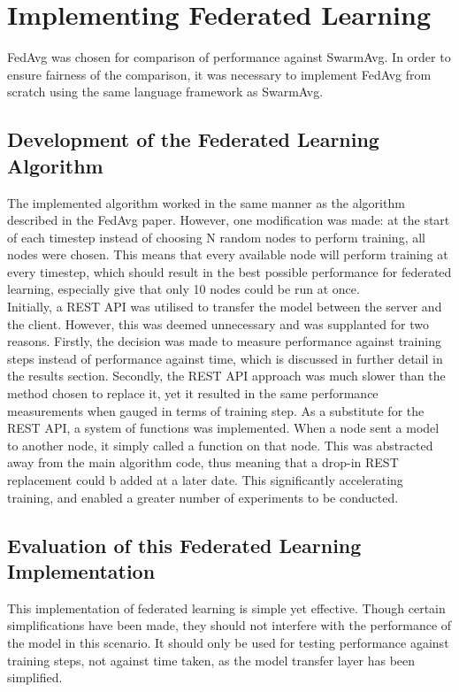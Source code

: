 \section{Implementing Federated Learning}
FedAvg was chosen for comparison of performance against SwarmAvg. In order to ensure fairness of the comparison, it was necessary to implement FedAvg from scratch using the same language framework as SwarmAvg.
\subsection{Development of the Federated Learning Algorithm}
The implemented algorithm worked in the same manner as the algorithm described in the FedAvg paper. However, one modification was made: at the start of each timestep instead of choosing N random nodes to perform training, all nodes were chosen. This means that every available node will perform training at every timestep, which should result in the best possible performance for federated learning, especially give that only 10 nodes could be run at once. \\

Initially, a REST API was utilised to transfer the model between the server and the client. However, this was deemed unnecessary and was supplanted for two reasons. Firstly, the decision was made to measure performance against training steps instead of performance against time, which is discussed in further detail in the results section. Secondly, the REST API approach was much slower than the method chosen to replace it, yet it resulted in the same performance measurements when gauged in terms of training step. As a substitute for the REST API, a system of functions was implemented. When a node sent a model to another node, it simply called a function on that node. This was abstracted away from the main algorithm code, thus meaning that a drop-in REST replacement could b added at a later date. This significantly accelerating training, and enabled a greater number of experiments to be conducted.

\subsection{Evaluation of this Federated Learning Implementation}
This implementation of federated learning is simple yet effective. Though certain simplifications have been made, they should not interfere with the performance of the model in this scenario. It should only be used for testing performance against training steps, not against time taken, as the model transfer layer has been simplified.

